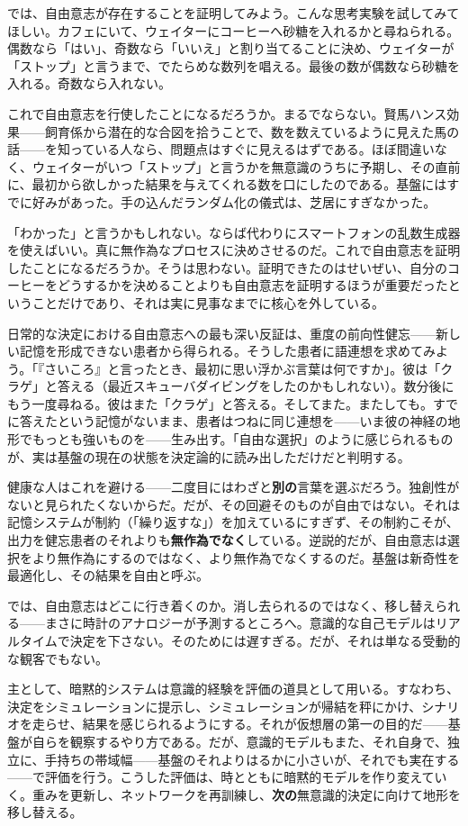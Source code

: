 \documentclass[11pt, twoside, openright]{book}
\begin{document}
では、自由意志が存在することを証明してみよう。こんな思考実験を試してみてほしい。カフェにいて、ウェイターにコーヒーへ砂糖を入れるかと尋ねられる。偶数なら「はい」、奇数なら「いいえ」と割り当てることに決め、ウェイターが「ストップ」と言うまで、でたらめな数列を唱える。最後の数が偶数なら砂糖を入れる。奇数なら入れない。

これで自由意志を行使したことになるだろうか。まるでならない。賢馬ハンス効果------飼育係から潜在的な合図を拾うことで、数を数えているように見えた馬の話------を知っている人なら、問題点はすぐに見えるはずである。ほぼ間違いなく、ウェイターがいつ「ストップ」と言うかを無意識のうちに予期し、その直前に、最初から欲しかった結果を与えてくれる数を口にしたのである。基盤にはすでに好みがあった。手の込んだランダム化の儀式は、芝居にすぎなかった。

「わかった」と言うかもしれない。ならば代わりにスマートフォンの乱数生成器を使えばいい。真に無作為なプロセスに決めさせるのだ。これで自由意志を証明したことになるだろうか。そうは思わない。証明できたのはせいぜい、自分のコーヒーをどうするかを決めることよりも自由意志を証明するほうが重要だったということだけであり、それは実に見事なまでに核心を外している。

日常的な決定における自由意志への最も深い反証は、重度の前向性健忘------新しい記憶を形成できない患者から得られる。そうした患者に語連想を求めてみよう。「『さいころ』と言ったとき、最初に思い浮かぶ言葉は何ですか」。彼は「クラゲ」と答える（最近スキューバダイビングをしたのかもしれない）。数分後にもう一度尋ねる。彼はまた「クラゲ」と答える。そしてまた。またしても。すでに答えたという記憶がないまま、患者はつねに同じ連想を------いま彼の神経の地形でもっとも強いものを------生み出す。「自由な選択」のように感じられるものが、実は基盤の現在の状態を決定論的に読み出しただけだと判明する。

健康な人はこれを避ける------二度目にはわざと\textbf{別の}言葉を選ぶだろう。独創性がないと見られたくないからだ。だが、その回避そのものが自由ではない。それは記憶システムが制約（「繰り返すな」）を加えているにすぎず、その制約こそが、出力を健忘患者のそれよりも\textbf{無作為でなく}している。逆説的だが、自由意志は選択をより無作為にするのではなく、より無作為でなくするのだ。基盤は新奇性を最適化し、その結果を自由と呼ぶ。

では、自由意志はどこに行き着くのか。消し去られるのではなく、移し替えられる------まさに時計のアナロジーが予測するところへ。意識的な自己モデルはリアルタイムで決定を下さない。そのためには遅すぎる。だが、それは単なる受動的な観客でもない。

主として、暗黙的システムは意識的経験を評価の道具として用いる。すなわち、決定をシミュレーションに提示し、シミュレーションが帰結を秤にかけ、シナリオを走らせ、結果を感じられるようにする。それが仮想層の第一の目的だ------基盤が自らを観察するやり方である。だが、意識的モデルもまた、それ自身で、独立に、手持ちの帯域幅------基盤のそれよりはるかに小さいが、それでも実在する------で評価を行う。こうした評価は、時とともに暗黙的モデルを作り変えていく。重みを更新し、ネットワークを再訓練し、\textbf{次の}無意識的決定に向けて地形を移し替える。
\end{document}
